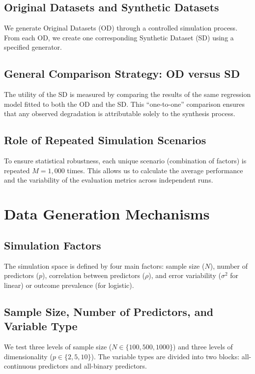\subsection{Original Datasets and Synthetic Datasets}
We generate Original Datasets (OD) through a controlled simulation process. From each OD, we create one corresponding Synthetic Dataset (SD) using a specified generator.

\subsection{General Comparison Strategy: OD versus SD}
The utility of the SD is measured by comparing the results of the same regression model fitted to both the OD and the SD. This ``one-to-one'' comparison ensures that any observed degradation is attributable solely to the synthesis process.

\subsection{Role of Repeated Simulation Scenarios}
To ensure statistical robustness, each unique scenario (combination of factors) is repeated $M = 1,000$ times. This allows us to calculate the average performance and the variability of the evaluation metrics across independent runs.

\section{Data Generation Mechanisms}
\label{sec:reg-generation-mechanisms}

\subsection{Simulation Factors}
The simulation space is defined by four main factors: sample size ($N$), number of predictors ($p$), correlation between predictors ($\rho$), and error variability ($\sigma^2$ for linear) or outcome prevalence (for logistic).

\subsection{Sample Size, Number of Predictors, and Variable Type}
We test three levels of sample size ($N \in \{100, 500, 1000\}$) and three levels of dimensionality ($p \in \{2, 5, 10\}$). The variable types are divided into two blocks: all-continuous predictors and all-binary predictors.

